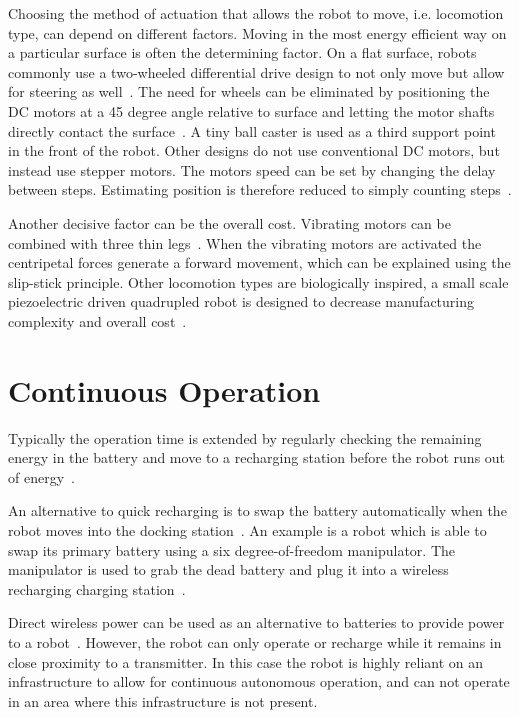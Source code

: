 Choosing the method of actuation that allows the robot to move, i.e. locomotion type, can depend on different factors.
Moving in the most energy efficient way on a particular surface is often the determining factor.
On a flat surface, robots commonly use a two-wheeled differential drive design to not only move but allow for steering as well~\cite{sabelhaus_icra_2013, pickem_icra_2015}.
The need for wheels can be eliminated by positioning the DC motors at a 45 degree angle relative to surface and letting the motor shafts directly contact the surface~\cite{kim_iros_2016}.
A tiny ball caster is used as a third support point in the front of the robot.
Other designs do not use conventional DC motors, but instead use stepper motors.
The motors speed can be set by changing the delay between steps. 
Estimating position is therefore reduced to simply counting steps~\cite{pickem_icra_2015}.

Another decisive factor can be the overall cost.
Vibrating motors can be combined with three thin legs~\cite{rubenstein_icra_2012}.
When the vibrating motors are activated the centripetal forces generate a forward movement, which can be explained using the slip-stick principle.
Other locomotion types are biologically inspired, a small scale piezoelectric driven quadrupled robot is designed to decrease manufacturing complexity and overall cost~\cite{baisch_iros_2013}.

\section{Continuous Operation}
\label{sec:rw_continous_operation}

Typically the operation time is extended by regularly checking the remaining energy in the battery and move to a recharging station before the robot runs out of energy~\cite{pickem_icra_2015, rubenstein_icra_2012}.

An alternative to quick recharging is to swap the battery automatically when the robot moves into the docking station~\cite{kemal_mech_2015}.
An example is a robot which is able to swap its primary battery using a six degree-of-freedom manipulator.
The manipulator is used to grab the dead battery and plug it into a wireless recharging charging station~\cite{zhang_conel_2013}.

Direct wireless power can be used as an alternative to batteries to provide power to a robot~\cite{karpelson_icra_2014}.
However, the robot can only operate or recharge while it remains in close proximity to a transmitter. 
In this case the robot is highly reliant on an infrastructure to allow for continuous autonomous operation, and can not operate in an area where this infrastructure is not present.
 
